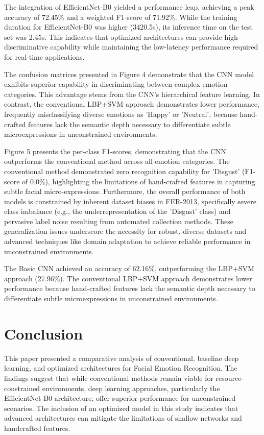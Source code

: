 \documentclass[pdflatex,sn-basic]{sn-jnl}
\theoremstyle{thmstyleone}
\theoremstyle{thmstyletwo}
\theoremstyle{thmstylethree}
\begin{document}
The integration of EfficientNet-B0 yielded a performance leap, achieving a peak accuracy of 72.45\% and a weighted F1-score of 71.92\%. While the training duration for EfficientNet-B0 was higher (3420.5s), its inference time on the test set was 2.45s. This indicates that optimized architectures can provide high discriminative capability while maintaining the low-latency performance required for real-time applications.

The confusion matrices presented in Figure 4 demonstrate that the CNN model exhibits superior capability in discriminating between complex emotion categories. This advantage stems from the CNN's hierarchical feature learning. In contrast, the conventional LBP+SVM approach demonstrates lower performance, frequently misclassifying diverse emotions as 'Happy' or 'Neutral', because hand-crafted features lack the semantic depth necessary to differentiate subtle microexpressions in unconstrained environments.

Figure 5 presents the per-class F1-scores, demonstrating that the CNN outperforms the conventional method across all emotion categories. The conventional method demonstrated zero recognition capability for 'Disgust' (F1-score of 0.0\%), highlighting the limitations of hand-crafted features in capturing subtle facial micro-expressions. Furthermore, the overall performance of both models is constrained by inherent dataset biases in FER-2013, specifically severe class imbalance (e.g., the underrepresentation of the 'Disgust' class) and pervasive label noise resulting from automated collection methods. These generalization issues underscore the necessity for robust, diverse datasets and advanced techniques like domain adaptation to achieve reliable performance in unconstrained environments.

The Basic CNN achieved an accuracy of 62.16\%, outperforming the LBP+SVM approach (27.96\%). The conventional LBP+SVM approach demonstrates lower performance because hand-crafted features lack the semantic depth necessary to differentiate subtle microexpressions in unconstrained environments.

\section{Conclusion}\label{sec4}
This paper presented a comparative analysis of conventional, baseline deep learning, and optimized architectures for Facial Emotion Recognition. The findings suggest that while conventional methods remain viable for resource-constrained environments, deep learning approaches, particularly the EfficientNet-B0 architecture, offer superior performance for unconstrained scenarios. The inclusion of an optimized model in this study indicates that advanced architectures can mitigate the limitations of shallow networks and handcrafted features.
\end{document}
